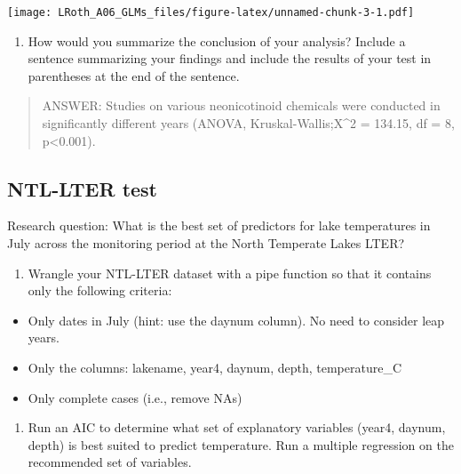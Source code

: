 \documentclass[]{article}
\providecommand{\tightlist}{%
  \setlength{\itemsep}{0pt}\setlength{\parskip}{0pt}}
\begin{document}
\texttt{[image: LRoth\_A06\_GLMs\_files/figure-latex/unnamed-chunk-3-1.pdf]}

\begin{enumerate}
\def\labelenumi{\arabic{enumi}.}
\setcounter{enumi}{8}
\tightlist
\item
  How would you summarize the conclusion of your analysis? Include a
  sentence summarizing your findings and include the results of your
  test in parentheses at the end of the sentence.
\end{enumerate}

\begin{quote}
ANSWER: Studies on various neonicotinoid chemicals were conducted in
significantly different years (ANOVA, Kruskal-Wallis;X\^{}2 = 134.15, df
= 8, p\textless{}0.001).
\end{quote}

\subsection{NTL-LTER test}\label{ntl-lter-test}

Research question: What is the best set of predictors for lake
temperatures in July across the monitoring period at the North Temperate
Lakes LTER?

\begin{enumerate}
\def\labelenumi{\arabic{enumi}.}
\setcounter{enumi}{10}
\tightlist
\item
  Wrangle your NTL-LTER dataset with a pipe function so that it contains
  only the following criteria:
\end{enumerate}

\begin{itemize}
\tightlist
\item
  Only dates in July (hint: use the daynum column). No need to consider
  leap years.
\item
  Only the columns: lakename, year4, daynum, depth, temperature\_C
\item
  Only complete cases (i.e., remove NAs)
\end{itemize}

\begin{enumerate}
\def\labelenumi{\arabic{enumi}.}
\setcounter{enumi}{11}
\tightlist
\item
  Run an AIC to determine what set of explanatory variables (year4,
  daynum, depth) is best suited to predict temperature. Run a multiple
  regression on the recommended set of variables.
\end{enumerate}
\end{document}
